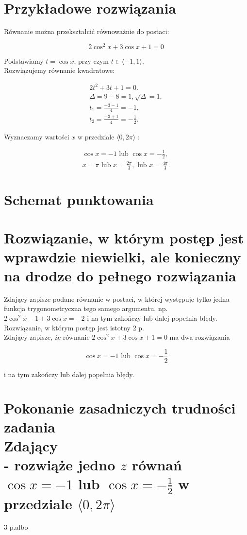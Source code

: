 \documentclass[10pt]{article}
\begin{document}
\section*{Przykładowe rozwiązania}
Równanie można przekształcić równoważnie do postaci:

$$
2 \cos ^{2} x+3 \cos x+1=0
$$

Podstawiamy $t=\cos x$, przy czym $t \in\langle-1,1\rangle$.\\
Rozwiązujemy równanie kwadratowe:

$$
\begin{gathered}
2 t^{2}+3 t+1=0 . \\
\Delta=9-8=1, \sqrt{\Delta}=1, \\
t_{1}=\frac{-3-1}{4}=-1, \\
t_{2}=\frac{-3+1}{4}=-\frac{1}{2} .
\end{gathered}
$$

Wyznaczamy wartości $x$ w przedziale $\langle 0,2 \pi\rangle$ :

$$
\begin{gathered}
\cos x=-1 \text { lub } \cos x=-\frac{1}{2}, \\
x=\pi \text { lub } x=\frac{2 \pi}{3}, \text { lub } x=\frac{4 \pi}{3} .
\end{gathered}
$$

\section*{Schemat punktowania}
\section*{Rozwiązanie, w którym postęp jest wprawdzie niewielki, ale konieczny na drodze do pełnego rozwiązania}
Zdający zapisze podane równanie w postaci, w której występuje tylko jedna funkcja trygonometryczna tego samego argumentu, np. $2 \cos ^{2} x-1+3 \cos x=-2$ i na tym zakończy lub dalej popełnia błędy.\\
Rozwiązanie, w którym postęp jest istotny 2 p.\\
Zdający zapisze, że równanie $2 \cos ^{2} x+3 \cos x+1=0$ ma dwa rozwiązania

$$
\cos x=-1 \text { lub } \cos x=-\frac{1}{2}
$$

i na tym zakończy lub dalej popełnia błędy.

\section*{Pokonanie zasadniczych trudności zadania \\
 Zdający \\
 - rozwiąże jedno $z$ równań $\cos x=-1$ lub $\cos x=-\frac{1}{2}$ w przedziale $\langle 0,2 \pi\rangle$}
 3 p.albo
\end{document}
